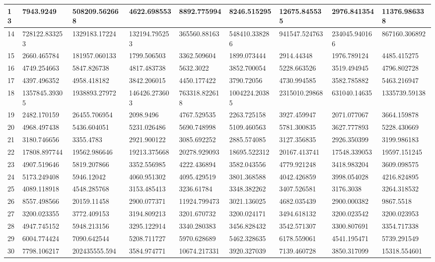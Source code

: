 \begin{table*}[hb!]
\begin{tabular}{|p{0.8cm}|p{1.6cm}|p{1.6cm}|p{1.6cm}|p{1.6cm}|p{1.6cm}|p{1.6cm}|p{1.6cm}|p{1.6cm}|}
 \hline
13  & 7943.9249 & 508209.562668 & 4622.698553 & 8892.775994 & 8246.515295 & 12675.845535 & 2976.841354 & 11376.986338 \\ 
 \hline
14  & 728122.833253 & 1329183.17224 & 132194.795253 & 365560.88163 & 548410.338286 & 941547.524763 & 234045.940166 & 867160.306892 \\ 
 \hline
15  & 2660.465784 & 181957.060133 & 1799.506503 & 3362.509604 & 1899.073444 & 2914.44348 & 1976.789124 & 4485.415275 \\ 
 \hline
16  & 4749.254663 & 5847.826738 & 4817.483738 & 5632.3022 & 3852.700054 & 5228.663526 & 3519.494945 & 4796.802728 \\ 
 \hline
17  & 4397.496352 & 4958.418182 & 3842.206015 & 4450.177422 & 3790.72056 & 4730.994585 & 3582.785882 & 5463.216947 \\ 
 \hline
18  & 1357845.39305 & 1938893.27972 & 146426.273603 & 763318.822618 & 1004224.20385 & 2315010.29868 & 631040.14635 & 1335739.59138 \\ 
 \hline
19  & 2482.170159 & 26455.706954 & 2098.9496 & 4767.529535 & 2263.725158 & 3927.459947 & 2071.077067 & 3664.159878 \\ 
 \hline
20  & 4968.497438 & 5436.604051 & 5231.026486 & 5690.748998 & 5109.460563 & 5781.300835 & 3627.777893 & 5228.430669 \\ 
 \hline
21  & 3180.746656 & 3355.4783 & 2921.900122 & 3085.692252 & 2885.574085 & 3127.356835 & 2926.350399 & 3199.986183 \\ 
 \hline
22  & 17808.897744 & 19562.986646 & 19213.375668 & 20278.929093 & 18695.522312 & 20167.413741 & 17548.339053 & 19597.151245 \\ 
 \hline
23  & 4907.519646 & 5819.207866 & 3352.556985 & 4222.436894 & 3582.043556 & 4779.921248 & 3418.983204 & 3609.098575 \\ 
 \hline
24  & 5173.249408 & 5946.12042 & 4060.951302 & 4095.429519 & 3801.368588 & 4042.426859 & 3998.054028 & 4216.824895 \\ 
 \hline
25  & 4089.118918 & 4548.285768 & 3153.485413 & 3236.61784 & 3348.382262 & 3407.526581 & 3176.3038 & 3264.318532 \\ 
 \hline
26  & 8557.498566 & 20159.11458 & 2900.077371 & 11924.799473 & 3021.136025 & 4682.035439 & 2900.000382 & 9867.5518 \\ 
 \hline
27  & 3200.023355 & 3772.409153 & 3194.809213 & 3201.670732 & 3200.024171 & 3494.618132 & 3200.023542 & 3200.023953 \\ 
 \hline
28  & 4947.745152 & 5948.213156 & 3295.122914 & 3340.280383 & 3456.828432 & 3542.571307 & 3300.807691 & 3354.717338 \\ 
 \hline
29  & 6004.774424 & 7090.642544 & 5208.711727 & 5970.628689 & 5462.328635 & 6178.559061 & 4541.195471 & 5739.291549 \\ 
 \hline
30  & 7798.106217 & 202435555.594 & 3584.974771 & 10674.217331 & 3920.327039 & 7139.460728 & 3850.317099 & 15318.554601 \\ 
 \hline


 \end{tabular}
\end{table*}